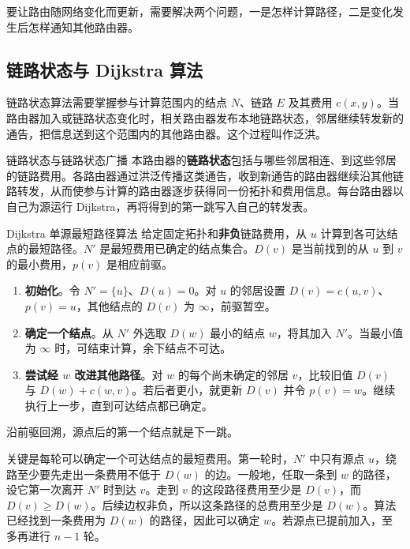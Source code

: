 要让路由随网络变化而更新，需要解决两个问题，一是怎样计算路径，二是变化发生后怎样通知其他路由器。

\subsection{链路状态与 Dijkstra 算法}
链路状态算法需要掌握参与计算范围内的结点 $N$、链路 $E$ 及其费用 $c(x,y)$。当路由器加入或链路状态变化时，相关路由器发布本地链路状态，邻居继续转发新的通告，把信息送到这个范围内的其他路由器。这个过程叫作泛洪。
\begin{definition}{链路状态与链路状态广播}
本路由器的\textbf{链路状态}包括与哪些邻居相连、到这些邻居的链路费用。各路由器通过洪泛传播这类通告，收到新通告的路由器继续沿其他链路转发，从而使参与计算的路由器逐步获得同一份拓扑和费用信息。每台路由器以自己为源运行 Dijkstra，再将得到的第一跳写入自己的转发表。
\end{definition}

\begin{proposition}{Dijkstra 单源最短路径算法}
给定固定拓扑和\textbf{非负}链路费用，从 $u$ 计算到各可达结点的最短路径。$N'$ 是最短费用已确定的结点集合。$D(v)$ 是当前找到的从 $u$ 到 $v$ 的最小费用，$p(v)$ 是相应前驱。
\begin{enumerate}[nosep]
  \item \textbf{初始化}。令 $N'=\{u\}$、$D(u)=0$。对 $u$ 的邻居设置 $D(v)=c(u,v)$、$p(v)=u$，其他结点的 $D(v)$ 为 $\infty$，前驱暂空。
  \item \textbf{确定一个结点}。从 $N'$ 外选取 $D(w)$ 最小的结点 $w$，将其加入 $N'$。当最小值为 $\infty$ 时，可结束计算，余下结点不可达。
  \item \textbf{尝试经 $w$ 改进其他路径}。对 $w$ 的每个尚未确定的邻居 $v$，比较旧值 $D(v)$ 与 $D(w)+c(w,v)$。若后者更小，就更新 $D(v)$ 并令 $p(v)=w$。继续执行上一步，直到可达结点都已确定。
\end{enumerate}
沿前驱回溯，源点后的第一个结点就是下一跳。
\end{proposition}
\begin{remark}
  关键是每轮可以确定一个可达结点的最短费用。第一轮时，$N'$ 中只有源点 $u$，绕路至少要先走出一条费用不低于 $D(w)$ 的边。一般地，任取一条到 $w$ 的路径，设它第一次离开 $N'$ 时到达 $v$。走到 $v$ 的这段路径费用至少是 $D(v)$，而 $D(v)\ge D(w)$。后续边权非负，所以这条路径的总费用至少是 $D(w)$。算法已经找到一条费用为 $D(w)$ 的路径，因此可以确定 $w$。若源点已提前加入，至多再进行 $n-1$ 轮。
\end{remark}

